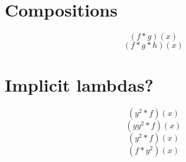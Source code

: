 \documentclass{article}
\begin{document}
\section{Compositions}
\[ (f*g)(x) \]
\[ (f*g*h)(x) \]
\section{Implicit lambdas?}
\[ (y^2 * f)(x) \]
\[ (y y^2 * f)(x) \]
\[ (y^2 * f)(x) \]
\[ (f * y^2)(x) \]
\end{document}
